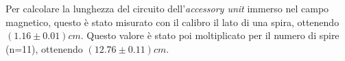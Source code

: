 {\fontsize{12}{14}\selectfont 

Per calcolare la lunghezza del circuito dell'\emph{accessory unit} immerso nel campo magnetico, questo è stato misurato con il calibro il lato di una spira, ottenendo $(1.16 \pm 0.01) cm$. Questo valore è stato poi moltiplicato per il numero di spire (n=11), ottenendo $(12.76 \pm 0.11) cm$. %
\\
\\






\par}